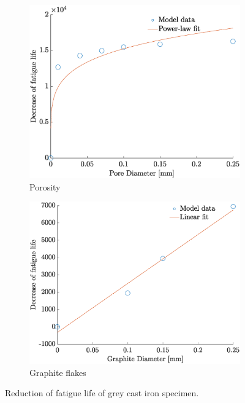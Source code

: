 \documentclass[11pt,a4paper]{article}
\begin{document}
\begin{figure} [ht]
\begin{subfigure}{0.51\textwidth}
\includegraphics[scale=0.37, center]{reduction_pore.eps}
\caption{Porosity}
\label{reduction_porosity}
\end{subfigure}
\begin{subfigure}{0.55\textwidth}
\includegraphics[scale=0.37, center]{decrease_graphite.eps}
\caption{Graphite flakes}
\end{subfigure}
\caption{Reduction of fatigue life of grey cast iron specimen.}
\label{reduction}
\end{figure}
\end{document}
